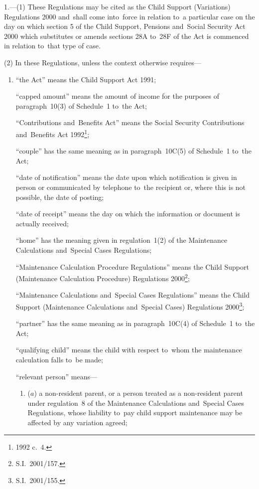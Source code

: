 \documentclass[12pt,a4paper]{article}
\begin{document}
1.---(1)  These Regulations may be cited as the Child Support (Variations) Regulations 2000 and~shall come into~force in relation to~a particular case on the day on which section 5 of the Child Support, Pensions and~Social Security Act 2000 which substitutes or amends sections 28A to~28F of the Act is commenced in relation to~that type of case.

(2) In these Regulations, unless the context otherwise requires—
\begin{enumerate}\item[]
“the Act” means the Child Support Act 1991;

“capped amount” means the amount of income for the purposes of paragraph~10(3) of Schedule~1 to~the Act;


“Contributions and~Benefits Act” means the Social Security Contributions and~Benefits Act 1992\footnote{1992 c.\ 4.};

“couple” has the same meaning as in paragraph~10C(5) of Schedule~1 to~the Act;

“date of notification” means the date upon which notification is given in person or communicated by telephone to~the recipient or, where this is not possible, the date of posting;

“date of receipt” means the day on which the information or document is actually received;

“home” has the meaning given in regulation~1(2) of the Maintenance Calculations and~Special Cases Regulations;

“Maintenance Calculation Procedure Regulations” means the Child Support (Maintenance Calculation Procedure) Regulations 2000\footnote{S.I.\ 2001/157.};

“Maintenance Calculations and~Special Cases Regulations” means the Child Support (Maintenance Calculations and~Special Cases) Regulations 2000\footnote{S.I.\ 2001/155.};

“partner” has the same meaning as in paragraph~10C(4) of Schedule~1 to~the Act;

“qualifying child” means the child with respect to~whom the maintenance calculation falls to~be made;

“relevant person” means—
\begin{enumerate}\item[]
($a$) 
a non-resident parent, or a person treated as a non-resident parent under regulation~8 of the Maintenance Calculations and~Special Cases Regulations, whose liability to~pay child support maintenance may be affected by any variation agreed;


\end{enumerate}
\end{enumerate}
\end{document}
